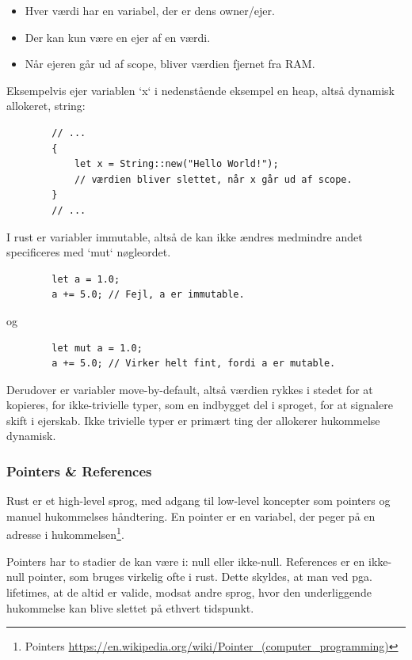 \documentclass{article}
\begin{document}
\begin{flushleft}
    \begin{itemize}
        \item Hver værdi har en variabel, der er dens owner/ejer.
        \item Der kan kun være en ejer af en værdi.
        \item Når ejeren går ud af scope, bliver værdien fjernet fra RAM.
    \end{itemize}

    Eksempelvis ejer variablen `x` i nedenstående eksempel en heap, altså dynamisk allokeret, string:

    \begin{verbatim}
        // ...
        {
            let x = String::new("Hello World!");
            // værdien bliver slettet, når x går ud af scope.
        }
        // ...
    \end{verbatim}

    I rust er variabler immutable, altså de kan ikke ændres medmindre andet specificeres med `mut` nøgleordet.

    \begin{verbatim}
        let a = 1.0;
        a += 5.0; // Fejl, a er immutable.
    \end{verbatim}

    og

    \begin{verbatim}
        let mut a = 1.0;
        a += 5.0; // Virker helt fint, fordi a er mutable.
    \end{verbatim}

    Derudover er variabler move-by-default, altså værdien rykkes i stedet for at kopieres, for ikke-trivielle typer, som en indbygget del i sproget,
    for at signalere skift i ejerskab.
    Ikke trivielle typer er primært ting der allokerer hukommelse dynamisk.

    \subsubsection{Pointers \& References}

    Rust er et high-level sprog, med adgang til low-level koncepter som pointers og manuel hukommelses håndtering.
    En pointer er en variabel, der peger på en adresse i hukommelsen\footnote{Pointers \url{https://en.wikipedia.org/wiki/Pointer_(computer_programming)}}.

    Pointers har to stadier de kan være i: null eller ikke-null. References er en ikke-null pointer, som bruges virkelig ofte i rust.
    Dette skyldes, at man ved pga. lifetimes, at de altid er valide, modsat andre sprog, hvor den underliggende hukommelse kan blive slettet på ethvert tidspunkt.


\end{flushleft}
\end{document}
